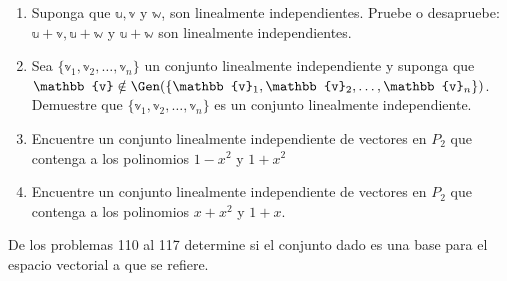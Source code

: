\begin{enumerate}[start=91]
    \item Suponga que $\mathbb{u}, \mathbb{v}$ y $\mathbb{w}$, son linealmente independientes. Pruebe o desapruebe: $\mathbb{u}+\mathbb{v}, \mathbb{u}+\mathbb{w}$ y $\mathbb{u}+\mathbb{w}$ son linealmente independientes.
    \item Sea $\{\mathbb{v}_{1}, \mathbb{v}_{2}, \dots, \mathbb{v}_{n}\}$ un conjunto linealmente independiente y suponga que $\mathbb{v} \notin \Gen ( \{\mathbb{v}_{1}, \mathbb{v}_{2}, \dots, \mathbb{v}_{n}\} )$. Demuestre que $\{\mathbb{v}_{1}, \mathbb{v}_{2}, \dots, \mathbb{v}_{n}\}$ es un conjunto linealmente independiente.
    \item Encuentre un conjunto linealmente independiente de vectores en $P_{2}$ que contenga a los polinomios $1-x^{2}$ y $1+x^{2}$
    \item Encuentre un conjunto linealmente independiente de vectores en $P_{2}$ que contenga a los polinomios $x+x^{2}$ y $1+x$.
\end{enumerate}
De los problemas 110 al 117 determine si el conjunto dado es una base para el espacio vectorial a que se refiere.
